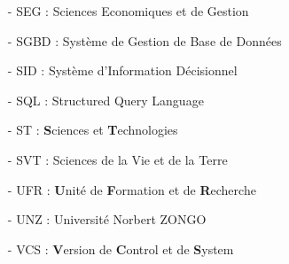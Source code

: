 \begin{itemize}
    \item[-]{
        SEG : Sciences Economiques et de Gestion
    }
    \item[-]{
        SGBD : Système de Gestion de Base de Données
    }
    \item[-]{
        SID : Système d'Information Décisionnel
    }
    \item[-]{
        SQL : Structured Query Language
    }
    \item[-]{
        ST : \textbf{S}ciences et \textbf{T}echnologies
    }
    \item[-]{
        SVT : Sciences de la Vie et de la Terre
    }
    \item[-]{
       UFR : \textbf{U}nité de \textbf{F}ormation et de \textbf{R}echerche
    }
    \item[-]{
        UNZ : Université Norbert ZONGO
    }
        \item[-]{
        VCS : \textbf{V}ersion de \textbf{C}ontrol et de \textbf{S}ystem
    }
  
\end{itemize}
